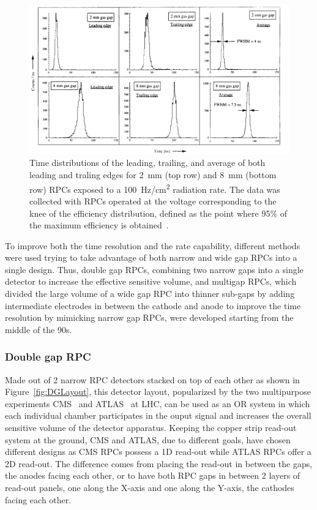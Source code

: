 	\begin{figure}[H]
		\centering
		\includegraphics[width = \linewidth]{fig/chapt4/Time-res-gap-width.png}
		\caption{\label{fig:GapWidthTime} Time distributions of the leading, trailing, and average of both leading and traling edges for \SI{2}{mm} (top row) and \SI{8}{mm} (bottom row) RPCs exposed to a \SI{100}{Hz/cm^2} radiation rate. The data was collected with RPCs operated at the voltage corresponding to the knee of the efficiency distribution, defined as the point where 95\% of the maximum efficiency is obtained~\cite{ZEBALLOS96COMP}.}
	\end{figure}
	
	To improve both the time resolution and the rate capability, different methods were used trying to take advantage of both narrow and wide gap RPCs into a single design. Thus, double gap RPCs, combining two narrow gaps into a single detector to increase the effective sensitive volume, and multigap RPCs, which divided the large volume of a wide gap RPC into thinner sub-gaps by adding intermediate electrodes in between the cathode and anode to improve the time resolution by mimicking narrow gap RPCs, were developed starting from the middle of the 90s.
	
		\subsubsection{Double gap RPC}
		\label{chapt4:sssec:DGRPC}
	
	Made out of 2 narrow RPC detectors stacked on top of each other as shown in Figure~\ref{fig:DGLayout}, this detector layout, popularized by the two multipurpose experiments CMS~\cite{MUONTDR} and ATLAS~\cite{ATLASTDR} at LHC, can be used as an OR system in which each individual chamber participates in the ouput signal and increases the overall sensitive volume of the detector apparatus. Keeping the copper strip read-out system at the ground, CMS and ATLAS, due to different goals, have chosen different designs as CMS RPCs possess a 1D read-out while ATLAS RPCs offer a 2D read-out. The difference comes from placing the read-out in between the gaps, the anodes facing each other, or to have both RPC gaps in between 2 layers of read-out panels, one along the X-axis and one along the Y-axis, the cathodes facing each other.
	
